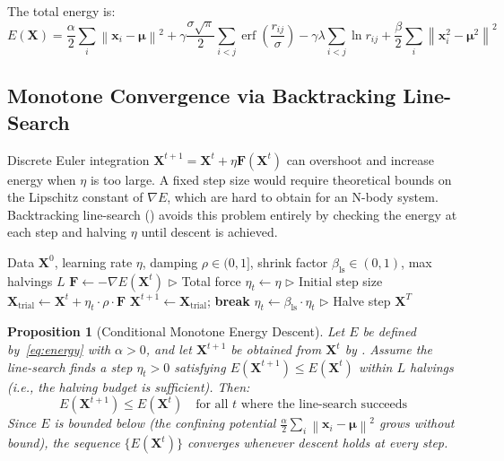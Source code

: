 \documentclass{article}
\newtheorem{proposition}[theorem]{Proposition}
\newcommand{\norm}[1]{\left\lVert#1\right\rVert}
\DeclareMathOperator{\erf}{erf}
\begin{document}
The total energy is:
\begin{equation}
\boxed{
E(\mathbf{X}) = \frac{\alpha}{2}\sum_i \norm{\mathbf{x}_i - \bm{\mu}}^2 + \gamma\frac{\sigma\sqrt{\pi}}{2}\sum_{i<j}\erf\!\left(\frac{r_{ij}}{\sigma}\right) - \gamma\lambda\sum_{i<j}\ln r_{ij} + \frac{\beta}{2}\sum_i \norm{\mathbf{x}_i^2 - \bm{\mu}^2}^2
}
\label{eq:energy}
\end{equation}

\subsection{Monotone Convergence via Backtracking Line-Search}

Discrete Euler integration $\mathbf{X}^{t+1} = \mathbf{X}^t + \eta \mathbf{F}(\mathbf{X}^t)$ can overshoot and increase energy when $\eta$ is too large. A fixed step size would require theoretical bounds on the Lipschitz constant of $\nabla E$, which are hard to obtain for an N-body system. Backtracking line-search () avoids this problem entirely by checking the energy at each step and halving $\eta$ until descent is achieved.

\begin{algorithm}[t]
\caption{GravityEngine Iteration with Backtracking Line-Search}
\label{alg:linesearch}
\begin{algorithmic}[1]
\REQUIRE Data $\mathbf{X}^0$, learning rate $\eta$, damping $\rho \in (0,1]$, shrink factor $\beta_{\text{ls}} \in (0,1)$, max halvings $L$
    \STATE $\mathbf{F} \leftarrow -\nabla E(\mathbf{X}^t)$ \hfill $\triangleright$ Total force
    \STATE $\eta_t \leftarrow \eta$ \hfill $\triangleright$ Initial step size
        \STATE $\mathbf{X}_{\text{trial}} \leftarrow \mathbf{X}^t + \eta_t \cdot \rho \cdot \mathbf{F}$
            \STATE $\mathbf{X}^{t+1} \leftarrow \mathbf{X}_{\text{trial}}$; \textbf{break}
        \ELSE
            \STATE $\eta_t \leftarrow \beta_{\text{ls}} \cdot \eta_t$ \hfill $\triangleright$ Halve step
        \ENDIF
    \ENDFOR
\ENDFOR
\RETURN $\mathbf{X}^T$
\end{algorithmic}
\end{algorithm}

\begin{proposition}[Conditional Monotone Energy Descent]
\label{thm:lyapunov}
Let $E$ be defined by~\eqref{eq:energy} with $\alpha > 0$, and let $\mathbf{X}^{t+1}$ be obtained from $\mathbf{X}^t$ by . Assume the line-search finds a step $\eta_t > 0$ satisfying $E(\mathbf{X}^{t+1}) \leq E(\mathbf{X}^t)$ within $L$ halvings (i.e., the halving budget is sufficient). Then:
\begin{equation}
E(\mathbf{X}^{t+1}) \leq E(\mathbf{X}^t) \quad \text{for all $t$ where the line-search succeeds}
\end{equation}
Since $E$ is bounded below (the confining potential $\frac{\alpha}{2}\sum_i \norm{\mathbf{x}_i - \bm{\mu}}^2$ grows without bound), the sequence $\{E(\mathbf{X}^t)\}$ converges whenever descent holds at every step.
\end{proposition}
\end{document}
